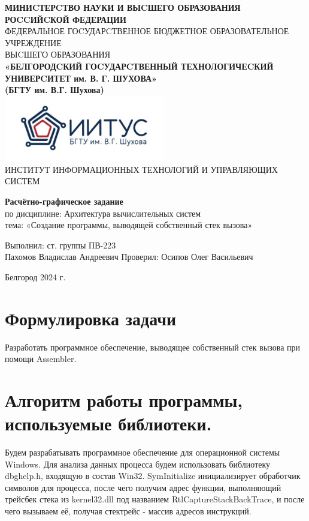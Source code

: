 \documentclass[a4paper,14pt]{extarticle}
\newcommand\textbox[1]{
	\parbox{.45\textwidth}{#1}
}
\begin{document}
\begin{center}
    \small{
        \textbf{МИНИCТЕРCТВО НАУКИ И ВЫCШЕГО ОБРАЗОВАНИЯ РОCCИЙCКОЙ ФЕДЕРАЦИИ}\\
        ФЕДЕРАЛЬНОЕ ГОCУДАРCТВЕННОЕ БЮДЖЕТНОЕ ОБРАЗОВАТЕЛЬНОЕ УЧРЕЖДЕНИЕ\\ВЫCШЕГО ОБРАЗОВАНИЯ \\
        \textbf{«БЕЛГОРОДCКИЙ ГОCУДАРCТВЕННЫЙ ТЕХНОЛОГИЧЕCКИЙ\\УНИВЕРCИТЕТ им. В. Г. ШУХОВА»\\ (БГТУ им. В.Г. Шухова)} \\
        \bigbreak
        \includegraphics[width=70mm]{log}\\
        ИНСТИТУТ ИНФОРМАЦИОННЫХ ТЕХНОЛОГИЙ И УПРАВЛЯЮЩИХ СИСТЕМ\\}
\end{center}

\vfill
\begin{center}
    \large{
        \textbf{
            Расчётно-графическое задание}}\\
    \normalsize{
        по дисциплине: Архитектура вычислительных систем \\
        тема: «Создание программы, выводящей собственный стек вызова»}
\end{center}
\vfill
\hfill\textbox{
    Выполнил: ст. группы ПВ-223\\Пахомов Владислав Андреевич
    \bigbreak
    Проверил: Осипов Олег Васильевич
}
\vfill\begin{center}
    Белгород 2024 г.
\end{center}
\newpage

\renewcommand{\contentsname}{Оглавление}
\tableofcontents\newpage

\section{Формулировка задачи}
Разработать программное обеспечение, выводящее собственный стек вызова
при помощи Assembler. 

\section{Алгоритм работы программы, используемые библиотеки.}
Будем разрабатывать программное обеспечение для операционной системы Windows.
Для анализа данных процесса будем использовать библиотеку dbghelp.h, входящую в 
состав Win32. SymInitialize инициализирует обработчик символов для процесса, после
чего получим адрес функции, выполняющий трейсбек стека из kernel32.dll под
названием RtlCaptureStackBackTrace, и после чего вызываем её, получая стектрейс - 
массив адресов инструкций.
\end{document}

